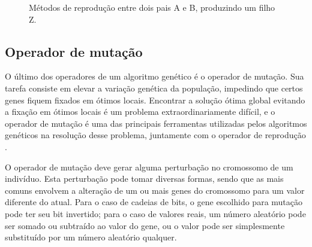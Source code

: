 \documentclass[12pt]{article}
\begin{document}
\begin{figure}[ht]
    \centering
    \hspace{0.8cm}
    \hspace{0.8cm}
    \caption{Métodos de reprodução entre dois pais A e B, produzindo um filho Z.}
    \label{fig:crossover}
\end{figure}

\subsection{Operador de mutação} \label{sec:mutation}

O último dos operadores de um algoritmo genético é o operador de mutação. Sua tarefa consiste em elevar a variação genética da população, impedindo que certos genes fiquem fixados em ótimos locais. Encontrar a solução ótima global evitando a fixação em ótimos locais é um problema extraordinariamente difícil, e o operador de mutação é uma das principais ferramentas utilizadas pelos algoritmos genéticos na resolução desse problema, juntamente com o operador de reprodução \cite{Mitchell1998}.

O operador de mutação deve gerar alguma perturbação no cromossomo de um indivíduo. Esta perturbação pode tomar diversas formas, sendo que as mais comuns envolvem a alteração de um ou mais genes do cromossomo para um valor diferente do atual. Para o caso de cadeias de bits, o gene escolhido para mutação pode ter seu bit invertido; para o caso de valores reais, um número aleatório pode ser somado ou subtraído ao valor do gene, ou o valor pode ser simplesmente substituído por um número aleatório qualquer.
\end{document}
